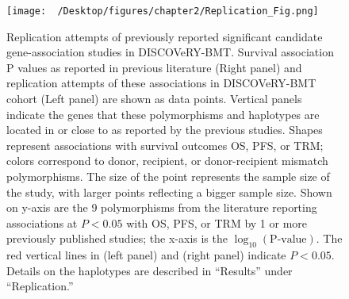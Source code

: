 \documentclass[]{DissertateOSU}
\begin{document}
\begin{figure}
    \centering
    \texttt{[image: ~/Desktop/figures/chapter2/Replication\_Fig.png]}
    \caption[Replication attempts of previously reported significant candidate gene-association studies in DISCOVeRY-BMT.]{Replication attempts of previously reported significant candidate gene-association studies in DISCOVeRY-BMT. Survival association P values as reported in previous literature (Right panel) and replication attempts of these associations in DISCOVeRY-BMT cohort (Left panel) are shown as data points. Vertical panels indicate the genes that these polymorphisms and haplotypes are located in or close to as reported by the previous studies. Shapes represent associations with survival outcomes OS, PFS, or TRM; colors correspond to donor, recipient, or donor-recipient mismatch polymorphisms. The size of the point represents the sample size of the study, with larger points reflecting a bigger sample size. Shown on y-axis are the 9 polymorphisms from the literature reporting associations at $P<0.05$ with OS, PFS, or TRM by 1 or more previously published studies; the x-axis is the $\log_{10}(\text{P-value})$. The red vertical lines in (left panel) and (right panel) indicate $P<0.05$. Details on the haplotypes are described in “Results” under “Replication.”}
    \label{fig:rep_fig}
\end{figure}
\end{document}
